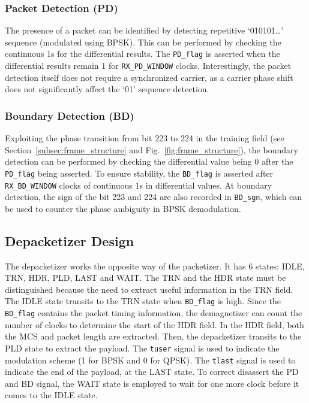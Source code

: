 \documentclass[journal,twoside]{IEEEtran}
\begin{document}
      \subsubsection{Packet Detection (PD)}
      The presence of a packet can be identified by detecting repetitive `010101\dots' sequence (modulated using BPSK).
      This can be performed by checking the continuous 1s for the differential results.
      The \texttt{PD\_flag} is asserted when the differential results remain 1 for \texttt{RX\_PD\_WINDOW} clocks.
      Interestingly, the packet detection itself does not require a synchronized carrier,
      as a carrier phase shift does not significantly affect the `01' sequence detection.

      \subsubsection{Boundary Detection (BD)}
      Exploiting the phase transition from bit 223 to 224 in the training field
      (see Section~\ref{subsec:frame_structure} and Fig.~\ref{fig:frame_structure}),
      the boundary detection can be performed by checking the differential value being 0
      after the \texttt{PD\_flag} being asserted.
      To ensure stability,
      the \texttt{BD\_flag} is asserted after \texttt{RX\_BD\_WINDOW} clocks of continuous 1s in differential values.
      At boundary detection,
      the sign of the bit 223 and 224 are also recorded in \texttt{BD\_sgn},
      which can be used to counter the phase ambiguity in BPSK demodulation.

    \subsection{Depacketizer Design}

      The depacketizer works the opposite way of the packetizer.
      It has 6 states: IDLE, TRN, HDR, PLD, LAST and WAIT.
      The TRN and the HDR state must be distinguished because the need
      to extract useful information in the TRN field.
      The IDLE state transits to the TRN state when \texttt{BD\_flag} is high.
      Since the \texttt{BD\_flag} contains the packet timing information,
      the demagnetizer can count the number of clocks to determine the start of the HDR field.
      In the HDR field, both the MCS and packet length are extracted.
      Then, the depacketizer transits to the PLD state to extract the payload.
      The \texttt{tuser} signal is used to indicate the modulation scheme (1 for BPSK and 0 for QPSK).
      The \texttt{tlast} signal is used to indicate the end of the payload, at the LAST state.
      To correct disassert the PD and BD signal,
      the WAIT state is employed to wait for one more clock
      before it comes to the IDLE state.
\end{document}
